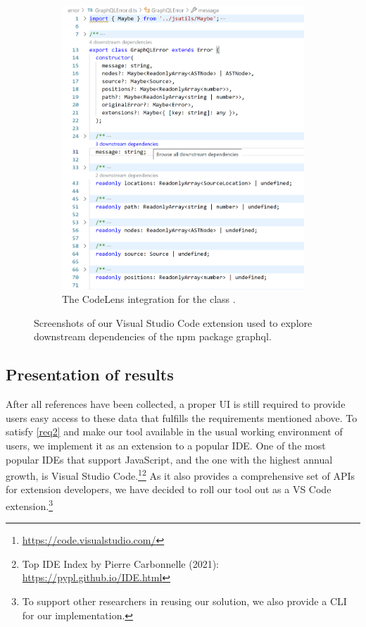 \begin{figure}[b]
\begin{subfigure}{.32\linewidth}
		\includegraphics[width=\linewidth]{sections/6_implementation/extension/codelens.png}
		\caption[LoF entry]{The CodeLens integration for the class .}
	\end{subfigure}

	\caption{Screenshots of our Visual Studio Code extension used to explore downstream dependencies of the npm package graphql.}
	\label{fig:implementation/presentation/screenshots}
\end{figure}

\subsection{Presentation of results}
\label{sec:implementation/presentation}

After all references have been collected, a proper UI is still required to provide users easy access to these data that fulfills the requirements mentioned above.
To satisfy \cref{req2} and make our tool available in the usual working environment of users, we implement it as an extension to a popular IDE.
One of the most popular IDEs that support JavaScript, and the one with the highest annual growth, is Visual Studio Code.\footnote{\url{https://code.visualstudio.com/}}\footnote{Top IDE Index by Pierre Carbonnelle (2021): \url{https://pypl.github.io/IDE.html}}
As it also provides a comprehensive set of APIs for extension developers, we have decided to roll our tool out as a VS Code extension.\footnote{To support other researchers in reusing our solution, we also provide a CLI for our implementation.}

